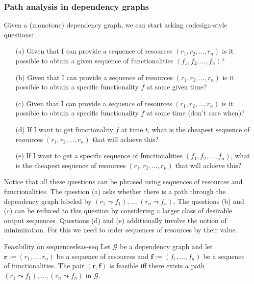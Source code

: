 \documentclass[12pt, a4paper]{article}
\theoremstyle{definition}
\theoremstyle{plain}
\theoremstyle{plain}
\theoremstyle{plain}
\theoremstyle{plain}
\theoremstyle{plain}
\theoremstyle{remark}
\theoremstyle{remark}
\newcommand{\mc}[1]{\mathcal{#1}}
\begin{document}
\subsubsection{Path analysis in dependency graphs}
Given a (monotone) dependency graph, we can start asking codesign-style questions:
\begin{itemize}
	\item[(a)] Given that I can provide a sequence of resources $(r_1,r_2, \ldots, r_n)$ is it possible to obtain a given sequence of functionalities $(f_1, f_2, \ldots, f_n)$?
	\item[(b)] Given that I can provide a sequence of resources $(r_1,r_2, \ldots, r_n)$ is it possible to obtain a specific functionality $f$ at some given time?
	\item[(c)] Given that I can provide a sequence of resources $(r_1,r_2, \ldots, r_n)$ is it possible to obtain a specific functionality $f$ at some time (don't care when)?
	\item[(d)] If I want to get functionality $f$ at time $t$, what is the cheapest sequence of resources $(r_1,r_2, \ldots, r_n)$ that will achieve this? 
	\item[(e)] If I want to get a specific sequence of functionalities $(f_1, f_2, \ldots, f_n)$, what is the cheapest sequence of resources $(r_1,r_2, \ldots, r_n)$ that will achieve this?
\end{itemize}

Notice that all these questions can be phrased using sequences of resources and functionalities. The question (a) asks whether there is a path through the dependency graph labeled by $(r_1 \leadsto f_1), \ldots, (r_n \leadsto f_n)$. The questions (b) and (c) can be reduced to this question by considering a larger class of desirable output sequences. Questions (d) and (e) additionally involve the notion of minimization. For this we need to order sequences of resources by their value.

\begin{tcdefinition}{Feasibility on sequences}{feas-seq}
	Let $\mc{G}$ be a dependency graph and let $\mathbf{r} := (r_1,\ldots,r_n)$ be a sequence of resources and $\mathbf{f} := (f_1, \ldots, f_n)$ be a sequence of functionalities. The pair $(\mathbf{r},\mathbf{f})$ is feasible iff there exists a path $(r_1 \leadsto f_1), \ldots, (r_n \leadsto f_n)$ in $\mc{G}$.
\end{tcdefinition}
\end{document}
